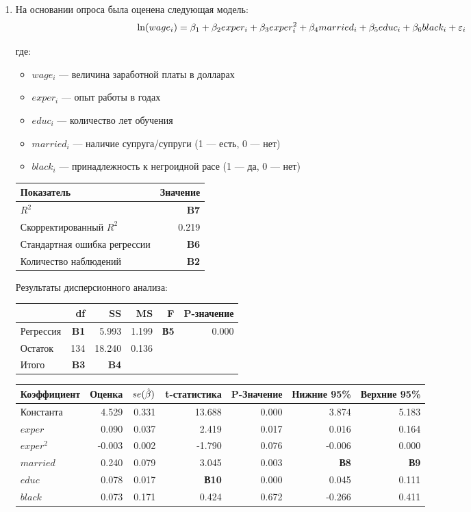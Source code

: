 \documentclass[12pt, a4paper]{article}\usepackage[]{graphicx}\usepackage[]{color}
\begin{document}
\begin{enumerate}

\item На основании опроса была оценена следующая модель:
\[
\ln(wage_i)=\beta_1 + \beta_2 exper_i + \beta_3 exper_i^2 + \beta_4 married_i + \beta_5 educ_i + \beta_6 black_i + \varepsilon_i
\]

где:
\begin{itemize}
\item $wage_i$ — величина заработной платы в долларах
\item $exper_i$ — опыт работы в годах
\item $educ_i$ — количество лет обучения
\item $married_i$ — наличие супруга/супруги (1 — есть, 0 — нет)
\item $black_i$ — принадлежность к негроидной расе (1 — да, 0 — нет)
\end{itemize}

\begin{tabular}{lr} \toprule
Показатель & Значение \\
\midrule
$R^2$                        & \textbf{B7} \\
Скорректированный $R^2$      & 0.219 \\
Стандартная ошибка регрессии & \textbf{B6} \\
Количество наблюдений        & \textbf{B2} \\
\bottomrule
\end{tabular}

Результаты дисперсионного анализа:

\begin{tabular}{lrrrrr} \toprule
 & df & SS & MS & F & P-значение \\
\midrule
Регрессия   & \textbf{B1}  & 5.993  & 1.199 & \textbf{В5} & 0.000 \\
Остаток     & 134 & 18.240 & 0.136 &    &       \\
Итого       & \textbf{B3}  & \textbf{B4}     &       &    &       \\
\bottomrule
\end{tabular}


\begin{tabular}{lrrrrrr} \toprule
Коэффициент & Оценка & $se(\hat{\beta})$ & t-статистика & P-Значение & Нижние 95\% & Верхние 95\% \\
\midrule
Константа & 4.529 & 0.331 & 13.688 & 0.000 & 3.874 & 5.183 \\
$exper$ & 0.090 & 0.037 & 2.419 & 0.017 & 0.016 & 0.164 \\
$exper^2$ & -0.003 & 0.002 & -1.790 & 0.076 & -0.006 & 0.000 \\
$married$ & 0.240 & 0.079 & 3.045 & 0.003 & \textbf{В8} & \textbf{В9} \\
$educ$ & 0.078 & 0.017 & \textbf{В10} & 0.000 & 0.045 & 0.111 \\
$black$ & 0.073 & 0.171 & 0.424 & 0.672 & -0.266 & 0.411 \\
\bottomrule
\end{tabular}


\end{enumerate}
\end{document}
